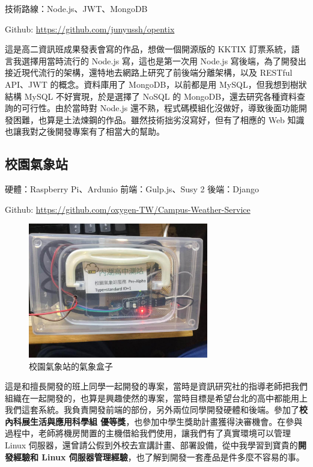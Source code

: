 \documentclass[classical]{einfart}
\begin{document}
技術路線：Node.js、JWT、MongoDB

Github: \url{https://github.com/junyussh/opentix}

這是高二資訊班成果發表會寫的作品，想做一個開源版的 KKTIX
訂票系統，語言我選擇用當時流行的 Node.js 寫，這也是第一次用 Node.js
寫後端，為了開發出接近現代流行的架構，還特地去網路上研究了前後端分離架構，以及
RESTful API、JWT 的概念。資料庫用了 MongoDB，以前都是用
MySQL，但我想到樹狀結構 MySQL 不好實現，於是選擇了 NoSQL 的
MongoDB，還去研究各種資料查詢的可行性。由於當時對 Node.js
還不熟，程式碼模組化沒做好，導致後面功能開發困難，也算是土法煉鋼的作品。雖然技術拙劣沒寫好，但有了相應的
Web 知識也讓我對之後開發專案有了相當大的幫助。

\subsection{校園氣象站}

硬體：Raspberry Pi、Ardunio 前端：Gulp.js、Susy 2 後端：Django

Github: \url{https://github.com/oxygen-TW/Campus-Weather-Service}

\begin{figure}[H]
    \centering
    \includegraphics[width=0.7\textwidth]{images/weather_box.jpg}
    \caption{校園氣象站的氣象盒子}
\end{figure}

這是和擅長開發的班上同學一起開發的專案，當時是資訊研究社的指導老師把我們組織在一起開發的，也算是興趣使然的專案，當時目標是希望台北的高中都能用上我們這套系統。我負責開發前端的部份，另外兩位同學開發硬體和後端。參加了\textbf{校內科展生活與應用科學組
優等獎}，也參加中學生獎助計畫獲得決審機會。在參與過程中，老師將機房閒置的主機借給我們使用，讓我們有了真實環境可以管理
Linux
伺服器，還曾請公假到外校去宣講計畫、部署設備，從中我學習到寶貴的\textbf{開發經驗和
Linux 伺服器管理經驗}，也了解到開發一套產品是件多麼不容易的事。
\end{document}
